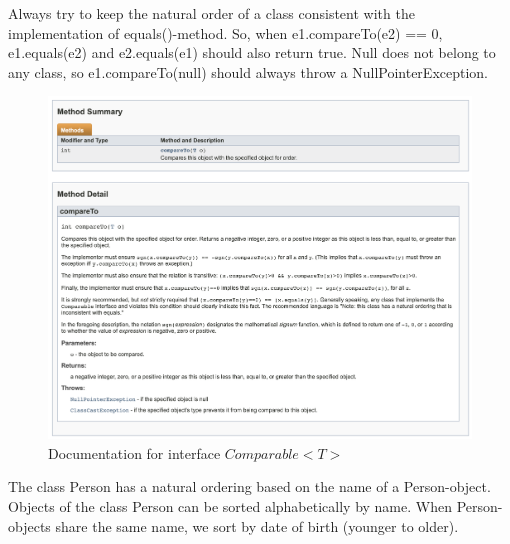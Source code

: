 Always try to keep the natural order of a class consistent with the implementation of equals()-method.  So, when e1.compareTo(e2) == 0, e1.equals(e2) and e2.equals(e1) should also return true.  Null does not belong to any class, so e1.compareTo(null) should always throw a NullPointerException.

\begin{figure}[H]
\includegraphics[width=\linewidth]{images/chapter_generics/javadoc_compareTo.png}
\caption{Documentation for interface $Comparable<T>$}
\label{fig:core_classes}
\end{figure}

The class Person has a natural ordering based on the name of a Person-object.  Objects of the class Person can be sorted alphabetically by name. When Person-objects share the same name, we sort by date of birth (younger to older).

